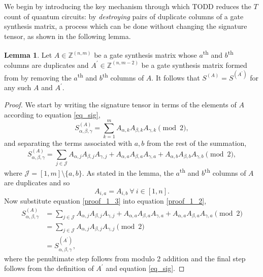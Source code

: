 \documentclass[notitlepage]{article}
\theoremstyle{definition}
\theoremstyle{problem}
\theoremstyle{lemma}
\newtheorem{lemma}{Lemma}[section]
\begin{document}

We begin by introducing the key mechanism through which TODD reduces the $T$ count of quantum circuits: by \emph{destroying} pairs of duplicate columns of a gate synthesis matrix, a process which can be done without changing the signature tensor, as shown in the following lemma.
\theoremstyle{Lemma}
\begin{lemma}{}
	\label{lemma_1}
	Let $A\in \mathbb{Z}^{(n,m)}$ be a gate synthesis matrix whose $a$\textsuperscript{th} and $b$\textsuperscript{th} columns are duplicates and $A^\prime\in \mathbb{Z}^{(n,m-2)}$ be a gate synthesis matrix formed from by removing the $a$\textsuperscript{th} and $b$\textsuperscript{th} columns of $A$. It follows that $S^{(A)}=S^{(A^\prime)}$ for any such $A$ and $A^\prime$.
\end{lemma}
\begin{proof}
	We start by writing the signature tensor in terms of the elements of $A$ according to equation \ref{eq_sig},
	\begin{equation}
	S^{(A)}_{\alpha,\beta,\gamma} = \sum_{k=1}^{m}A_{\alpha,k}A_{\beta,k}A_{\gamma,k} \pmod{2},
	\end{equation}
	and separating the terms associated with $a,b$ from the rest of the summation,
	\begin{equation}
	\label{proof_1_2}
	S^{(A)}_{\alpha,\beta,\gamma} = \sum_{j\in \mathcal{J}}A_{\alpha,j}A_{\beta,j}A_{\gamma,j} + A_{\alpha,a}A_{\beta,a}A_{\gamma,a} + A_{\alpha,b}A_{\beta,b}A_{\gamma,b} \pmod{2},
	\end{equation}
	where $\mathcal{J} = \left[1,m\right]\setminus \{a, b\}$.
	As stated in the lemma, the $a$\textsuperscript{th} and $b$\textsuperscript{th} columns of $A$ are duplicates and so
	\begin{equation}
		\label{proof_1_3}
		A_{i,a} = A_{i,b}\ \forall\ i \in \left[1,n\right].
	\end{equation}
	Now substitute equation \ref{proof_1_3} into equation \ref{proof_1_2},
	\begin{align}
	S^{(A)}_{\alpha,\beta,\gamma} &= \sum_{j\in \mathcal{J}}A_{\alpha,j}A_{\beta,j}A_{\gamma,j} + A_{\alpha,a}A_{\beta,a}A_{\gamma,a} + A_{\alpha,a}A_{\beta,a}A_{\gamma,a} \pmod{2}\\
	&= \sum_{j\in \mathcal{J}}A_{\alpha,j}A_{\beta,j}A_{\gamma,j} \pmod{2}\\
	&= S^{(A^\prime)}_{\alpha,\beta,\gamma},
	\end{align}
	where the penultimate step follows from modulo 2 addition and the final step follows from the definition of $A^\prime$ and equation \ref{eq_sig}.
\end{proof}
\end{document}
